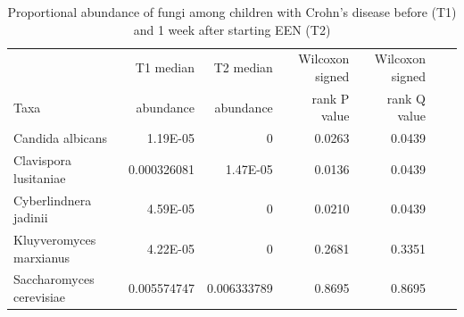 {\footnotesize
	\renewcommand{\arraystretch}{0.7} \setlength{\tabcolsep}{3pt}
	\begin{longtable}{ | l | r | r | r | r | r | r  | }
		\caption[  Proportional abundance of fungi among children with Crohn's disease before (T1) and 1 week after starting EEN (T2) ]{  Proportional abundance of fungi among children with Crohn's disease before (T1) and 1 week after starting EEN (T2)	} 
		\label{TS13} \\
		
		\hline 
		& T1  median& T2  median & Wilcoxon signed  & Wilcoxon signed \\ 
		Taxa & abundance & abundance & rank P value & rank Q value \\
		\hline 
		\endfirsthead
		
		
		\endfoot
		
		\hline 
		\endlastfoot
		
		Candida albicans & 1.19E-05 & 0 & 0.0263 & 0.0439 \\ 
		Clavispora lusitaniae & 0.000326081 & 1.47E-05 & 0.0136 & 0.0439 \\ 
		Cyberlindnera jadinii & 4.59E-05 & 0 & 0.0210 & 0.0439 \\ 
		Kluyveromyces marxianus & 4.22E-05 & 0 & 0.2681 & 0.3351 \\ 
		Saccharomyces cerevisiae & 0.005574747 & 0.006333789 & 0.8695 & 0.8695
		
	\end{longtable}
}




